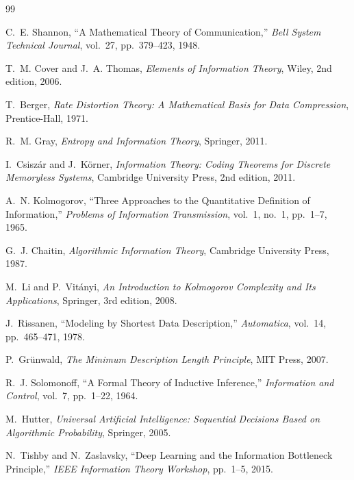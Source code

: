 \documentclass[11pt,a4paper]{article}
\theoremstyle{definition}
\theoremstyle{remark}
\begin{document}
\newpage
\begin{thebibliography}{99}

C.~E. Shannon,
\newblock ``A Mathematical Theory of Communication,''
\newblock \emph{Bell System Technical Journal}, vol.~27, pp.~379--423, 1948.

T.~M. Cover and J.~A. Thomas,
\newblock \emph{Elements of Information Theory},
\newblock Wiley, 2nd edition, 2006.

T.~Berger,
\newblock \emph{Rate Distortion Theory: A Mathematical Basis for Data Compression},
\newblock Prentice-Hall, 1971.

R.~M. Gray,
\newblock \emph{Entropy and Information Theory},
\newblock Springer, 2011.

I.~Csisz\'{a}r and J.~K\"{o}rner,
\newblock \emph{Information Theory: Coding Theorems for Discrete Memoryless Systems},
\newblock Cambridge University Press, 2nd edition, 2011.

A.~N. Kolmogorov,
\newblock ``Three Approaches to the Quantitative Definition of Information,''
\newblock \emph{Problems of Information Transmission}, vol.~1, no.~1, pp.~1--7, 1965.

G.~J. Chaitin,
\newblock \emph{Algorithmic Information Theory},
\newblock Cambridge University Press, 1987.

M.~Li and P.~Vit\'{a}nyi,
\newblock \emph{An Introduction to Kolmogorov Complexity and Its Applications},
\newblock Springer, 3rd edition, 2008.

J.~Rissanen,
\newblock ``Modeling by Shortest Data Description,''
\newblock \emph{Automatica}, vol.~14, pp.~465--471, 1978.

P.~Gr\"{u}nwald,
\newblock \emph{The Minimum Description Length Principle},
\newblock MIT Press, 2007.

R.~J. Solomonoff,
\newblock ``A Formal Theory of Inductive Inference,''
\newblock \emph{Information and Control}, vol.~7, pp.~1--22, 1964.

M.~Hutter,
\newblock \emph{Universal Artificial Intelligence: Sequential Decisions Based on Algorithmic Probability},
\newblock Springer, 2005.

N.~Tishby and N.~Zaslavsky,
\newblock ``Deep Learning and the Information Bottleneck Principle,''
\newblock \emph{IEEE Information Theory Workshop}, pp.~1--5, 2015.


\end{thebibliography}
\end{document}
